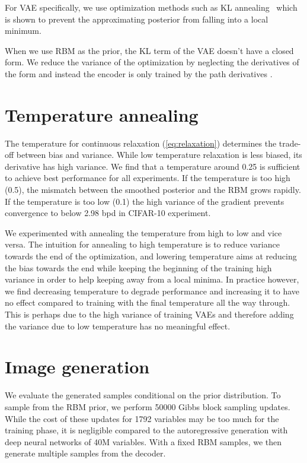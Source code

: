 \documentclass{article}
\begin{document}
For VAE specifically, we use optimization methods such as KL annealing~\cite{sonderby2016ladder} which is shown to prevent the approximating posterior from falling into a local minimum.

When we use RBM as the prior, the KL term of the VAE doesn't have a closed form. We reduce the variance of the optimization by neglecting the derivatives of the form  and instead the encoder is only trained by the path derivatives \cite{roeder2017sticking}.

\section{Temperature annealing}
The temperature  for continuous relaxation (\ref{eq:relaxation}) determines the trade-off between bias and variance. While low temperature relaxation is less biased, its derivative has high variance. We find that a temperature around 0.25 is sufficient to achieve best performance for all experiments. If the temperature is too high (0.5), the mismatch between the smoothed posterior and the RBM grows rapidly. If the temperature is too low (0.1) the high variance of the gradient prevents convergence to below 2.98 bpd in CIFAR-10 experiment.

We experimented with annealing the temperature from high to low and vice versa. The intuition for annealing to high temperature is to reduce variance towards the end of the optimization, and lowering temperature aims at reducing the bias towards the end while keeping the beginning of the training high variance in order to help keeping away from a local minima. In practice however, we find decreasing temperature to degrade performance and increasing it to have no effect compared to training with the final temperature all the way through. This is perhaps due to the high variance of training VAEs and therefore adding the variance due to low temperature has no meaningful effect.

\section{Image generation}
\label{app:conditional}
We evaluate the generated samples conditional on the prior distribution. To sample from the RBM prior, we perform 50000 Gibbs block sampling updates. While the cost of these updates for 1792 variables may be too much for the training phase, it is negligible compared to the autoregressive generation with deep neural networks of 40M variables. With a fixed RBM samples, we then generate multiple samples from the decoder. 
\end{document}
